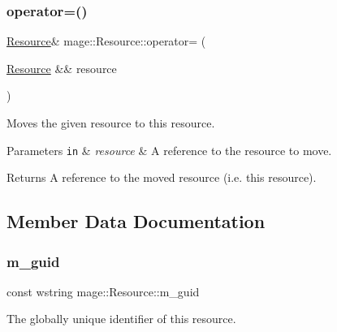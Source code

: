 \subsubsection{\texorpdfstring{operator=()}{operator=()}\hspace{0.1cm}{\footnotesize\ttfamily [2/2]}}
{\footnotesize\ttfamily \hyperlink{classmage_1_1_resource}{Resource}\& mage\+::\+Resource\+::operator= (\begin{DoxyParamCaption}\item[{\hyperlink{classmage_1_1_resource}{Resource} \&\&}]{resource }\end{DoxyParamCaption})\hspace{0.3cm}{\ttfamily [delete]}}

Moves the given resource to this resource.


\begin{DoxyParams}[1]{Parameters}
\mbox{\tt in}  & {\em resource} & A reference to the resource to move. \\
\hline
\end{DoxyParams}
\begin{DoxyReturn}{Returns}
A reference to the moved resource (i.\+e. this resource). 
\end{DoxyReturn}


\subsection{Member Data Documentation}
\hypertarget{classmage_1_1_resource_aa5e176b2528581bf1b662f5a77aeef40}{}\label{classmage_1_1_resource_aa5e176b2528581bf1b662f5a77aeef40} 
\subsubsection{\texorpdfstring{m\+\_\+guid}{m\_guid}}
{\footnotesize\ttfamily const wstring mage\+::\+Resource\+::m\+\_\+guid\hspace{0.3cm}{\ttfamily [private]}}

The globally unique identifier of this resource. 